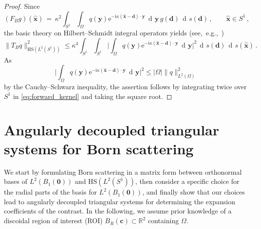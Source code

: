 \documentclass[11pt,a4paper]{article}
\theoremstyle{definition}
\theoremstyle{remark} \newtheorem{remark}[theorem]{Remark}
\numberwithin{equation}{section}
\numberwithin{figure}{section}
\numberwithin{algorithm}{section}
\numberwithin{table}{section}
\newcommand{\field}[1]{{\mathbb{#1}}}
\newcommand{\R}{\field{R}}
\newcommand{\bs}{\boldsymbol}
\newcommand{\bfc}{{\bs c}}
\newcommand{\bfd}{{\bs d}}
\newcommand{\bfx}{{\bs x}}
\newcommand{\bfy}{{\bs y}}
\newcommand{\bfzero}{{\bs 0}}
\newcommand{\xhat}{\widehat{\bfx}}
\newcommand{\HS}{\mathrm{HS}}
\newcommand{\ds}{\, \dif s}
\newcommand{\dy}{\, \dif \bfy}
\newcommand{\idir}{\bfd}
\newcommand{\rmi}{\mathrm{i}}
\newcommand{\rme}{\mathrm{e}}
\newcommand{\Sone}{{S^1}}
\newcommand{\Ltwo}{{L^2}}
\DeclareMathOperator{\dif}{d\!}
\begin{document}
\begin{proof}
Since
\begin{equation*}
(F_B g)(\xhat) \, = \,  \kappa^2 \int_{\Sone} \int_{\Omega} q(\bfy)\rme^{-\rmi \kappa (\xhat-\idir)\cdot\bfy}\dy\, g(\idir) \ds (\idir)\,, \qquad \xhat \in\Sone\,,
\end{equation*}
the basic theory on Hilbert--Schmidt integral operators yields (see,~e.g.,~\cite{Weidmann1980})
\begin{equation}
\label{eq:forward_kernel}
\| T_B q \|_{\HS(\Ltwo(\Sone))}^2 
\leq 
\kappa^4 \int_{\Sone} \int_{\Sone} \bigg | \int_{\Omega} q(\bfy)\rme^{-\rmi \kappa (\xhat-\idir)\cdot\bfy}\dy \bigg|^2  \ds (\idir)  \ds (\xhat) \, .
\end{equation}
As 
\begin{equation*}
 \bigg | \int_{\Omega} q(\bfy)\rme^{-\rmi \kappa (\xhat-\idir)\cdot\bfy}\dy \bigg|^2 \leq |\Omega| \| q \|_{L^2(\Omega)}^2 \, 
\end{equation*}
by the Cauchy--Schwarz inequality, the assertion follows by integrating twice over $\Sone$ in \eqref{eq:forward_kernel} and taking the square root.
\end{proof}

\section{Angularly decoupled triangular systems for Born scattering}
\label{sec:MatrixReprForwardProblem}

 We start by formulating Born scattering in a matrix form between orthonormal bases of $L^2(B_1(\bfzero))$ and $\HS(\Ltwo(\Sone))$, then consider a specific choice for the radial parts of the basis for $L^2(B_1(\bfzero))$, and finally show that our choices lead to angularly decoupled triangular systems for determining the expansion coefficients of the contrast. In the following, we assume prior knowledge of a discoidal region of interest (ROI) $B_R(\bfc)\subset\R^2$ containing $\Omega$.
\end{document}
